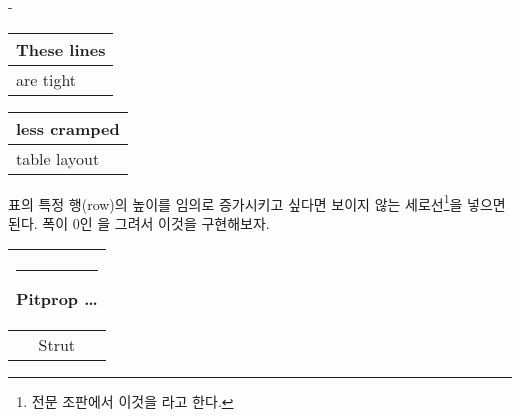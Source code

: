 \begin{adjustwidth}{0pt}{-\margheadwidth}


\begin{example}
\begin{tabular}{|l|}
\hline
These lines\\\hline
are tight\\\hline
\end{tabular}

{\renewcommand{\arraystretch}{1.5}
\renewcommand{\tabcolsep}{0.2cm}
\begin{tabular}{|l|}
\hline
less cramped\\\hline
table layout\\\hline
\end{tabular}}

\end{example}

표의 특정 행(row)의 높이를 임의로 증가시키고 싶다면 보이지 않는 세로선\footnote{전문 조판에서 이것을 라고 한다.}을 넣으면 된다.
폭이 0인 을 그려서 이것을 구현해보자.\label{strutrule}

\begin{example}
\begin{tabular}{|c|}
\hline
\rule{1pt}{4ex}Pitprop \ldots\\
\hline
\rule{0pt}{4ex}Strut\\
\hline
\end{tabular}
\end{example}


\end{adjustwidth}
